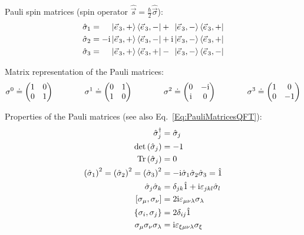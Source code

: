 			\noindent
			Pauli spin matrices (spin operator $\hat{\vec{s}} = \frac{\hbar}{2} \hat{\vec{\sigma}}$):
			\begin{equation}
				\begin{aligned}
					\hat{\sigma}_1 &= \phantom{-\i}\Ket{\vec{e}_3,+} \Bra{\vec{e}_3,-} + \phantom{\i}\Ket{\vec{e}_3,-} \Bra{\vec{e}_3,+} \\
					\hat{\sigma}_2 &= -\i\Ket{\vec{e}_3,+} \Bra{\vec{e}_3,-} + \i\Ket{\vec{e}_3,-} \Bra{\vec{e}_3,+} \\
					\hat{\sigma}_3 &= \phantom{-\i}\Ket{\vec{e}_3,+} \Bra{\vec{e}_3,+} - \phantom{\i}\Ket{\vec{e}_3,-} \Bra{\vec{e}_3,-} \\
				\end{aligned}
			\end{equation}

			\noindent
			Matrix representation of the Pauli matrices:
			\begin{equation}
				\label{Eq:PauliMatricesQFT}
				\begin{aligned}
					\sigma^0 \doteq \mqty(
					1 & 0 \\
					0 & 1 \\
					) &&\hsp
					\sigma^1 \doteq \mqty(
					0 & 1 \\
					1 & 0 \\
					) &&\hsp
					\sigma^2 \doteq \mqty(
					0 & -\i \\
					\i & 0 \\
					) &&\hsp
					\sigma^3 \doteq \mqty(
					1 & 0 \\
					0 & -1 \\
					)
				\end{aligned}
			\end{equation}

			\noindent
			Properties of the Pauli matrices (see also Eq.~\ref{Eq:PauliMatricesQFT}):
			\begin{align}
				\label{Eq:PauliMatrices}
				\hat{\sigma}_j^\dagger &= \hat{\sigma}_j \\
				\det\qty(\hat{\sigma}_j) &= -1 \\
				\tr\qty(\hat{\sigma}_j) &= 0 \\
				\qty(\hat{\sigma}_1)^2 = \qty(\hat{\sigma}_2)^2 = \qty(\hat{\sigma}_3)^2 &= -\i\hat{\sigma}_1\hat{\sigma}_2\hat{\sigma}_3 = \hat{1} \\
				\hat{\sigma}_j \hat{\sigma}_k &= \delta_{jk}\hat{1} + \i\levicivita{jkl}\hat{\sigma}_l \\
				\comm{\sigma_\mu}{\sigma_\nu} &= 2\i\levicivita{\mu\nu\lambda}\sigma_\lambda \\
				\acomm{\sigma_i}{\sigma_j} &= 2\delta_{ij}\hat{1} \\
				\sigma_\mu \sigma_\nu \sigma_\lambda &= \i\levicivita{\xi\mu\nu\lambda}\sigma_\xi \\
			\end{align}

